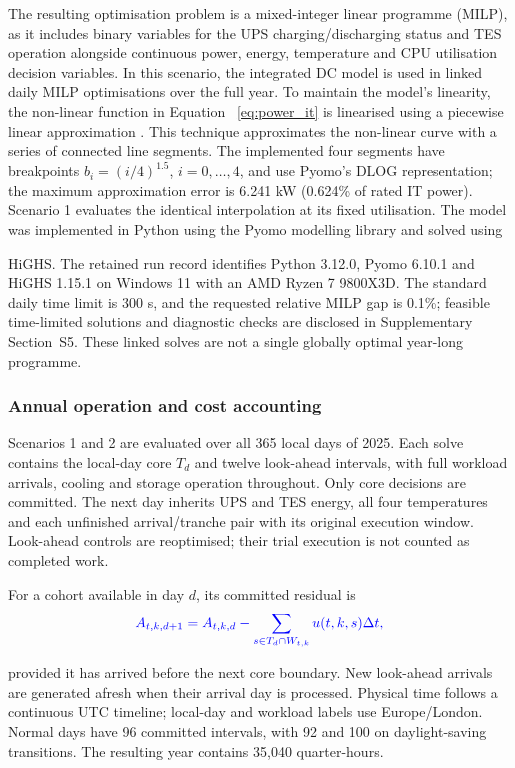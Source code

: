 \documentclass[lettersize,journal]{IEEEtran}
\providecommand{\DIFadd}[1]{{\color{blue}#1}}
\providecommand{\DIFaddbegin}{}
\providecommand{\DIFaddend}{}
\begin{document}
\DIFaddbegin \DIFadd{The resulting optimisation problem is a mixed-integer linear programme (MILP), as it includes binary variables for the UPS charging/discharging status and TES operation alongside continuous power, energy, temperature and CPU utilisation decision variables. }\DIFaddend In this scenario, the integrated DC model is used in  \DIFaddbegin \DIFadd{linked daily MILP optimisations over the full year}\DIFaddend . To maintain the model's linearity, the non-linear function in Equation~ \DIFaddbegin \DIFadd{\eqref{eq:power_it} is linearised }\DIFaddend using a piecewise linear approximation . This technique approximates the non-linear curve with a series of connected line segments. The \DIFaddbegin \DIFadd{implemented four segments have breakpoints $b_i=(i/4)^{1.5}$, $i=0,\ldots,4$, and use Pyomo's DLOG representation; the maximum approximation error is 6.241 kW (0.624\% of rated IT power). Scenario 1 evaluates the identical interpolation at its fixed utilisation. The }\DIFaddend model was implemented in Python using the Pyomo modelling library and solved using  \DIFaddbegin \DIFadd{HiGHS. The retained run record identifies Python 3.12.0, Pyomo 6.10.1 and HiGHS 1.15.1 on Windows 11 with an AMD Ryzen 7 9800X3D. The standard daily time limit is 300 s, and the requested relative MILP gap is 0.1\%; feasible time-limited solutions and diagnostic checks are disclosed in Supplementary Section~S5. These linked solves are not a single globally optimal year-long programme.

}\DIFaddend 



\DIFaddbegin \subsubsection{\DIFadd{Annual operation and cost accounting}}\label{sec:annual-operation}
\DIFadd{Scenarios 1 and 2 are evaluated over all 365 local days of 2025. Each solve contains the local-day core $T_d$ and twelve look-ahead intervals, with full workload arrivals, cooling and storage operation throughout. Only core decisions are committed. The next day inherits UPS and TES energy, all four temperatures and each unfinished arrival/tranche pair with its original execution window. Look-ahead controls are reoptimised; their trial execution is not counted as completed work.

}

\DIFadd{For a cohort available in day $d$, its committed residual is
}\begin{equation}
\DIFadd{A_{t,k,d+1}=A_{t,k,d}-\sum_{s\in T_d\cap W_{t,k}}u(t,k,s)\Delta t,
\label{eq:cohort-handoff}
}\end{equation}
\DIFadd{provided it has arrived before the next core boundary. New look-ahead arrivals are generated afresh when their arrival day is processed. Physical time follows a continuous UTC timeline; local-day and workload labels use Europe/London. Normal days have 96 committed intervals, with 92 and 100 on daylight-saving transitions. The resulting year contains 35,040 quarter-hours.

}
\end{document}
